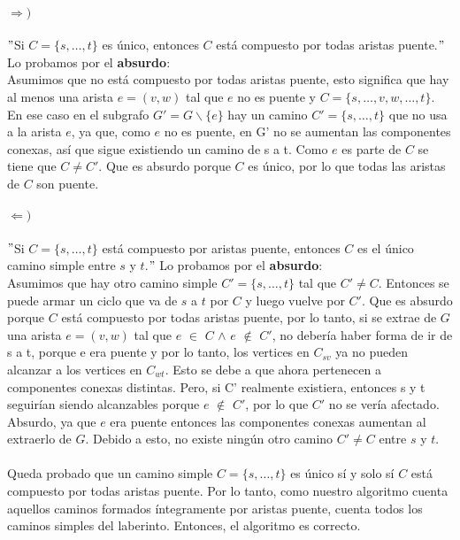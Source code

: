 \documentclass[../main.tex]{subfiles}
\begin{document}
\paragraph{\(\Rightarrow)\)} $"$Si \(C = \{s, \ldots, t\}\) es único, entonces \(C\) está compuesto por todas aristas puente.$"$ Lo probamos por el \textbf{absurdo}: \\
Asumimos que no está compuesto por todas aristas puente, esto significa que hay al menos una arista \(e = (v, w)\) tal que \(e\) no es puente y \(C = \{s, \ldots, v, w, \ldots, t\}\). \\
En ese caso en el subgrafo \(G' = G \backslash \{e\}\) hay un camino \(C' = \{s, \ldots, t\}\) que no usa a la arista \(e\), ya que, como \(e\) no es puente, en G' no se aumentan las componentes conexas, así que sigue existiendo un camino de s a t. Como \(e\) es parte de \(C\) se tiene que \(C \neq C'\). Que es absurdo porque \(C\) es único, por lo que todas las aristas de \(C\) son puente. \done
\paragraph{\(\Leftarrow)\)} $"$Si \(C = \{s, \ldots, t\}\) está compuesto por aristas puente, entonces \(C\) es el único camino simple entre \(s\)  y \(t\).$"$ Lo probamos por el \textbf{absurdo}: \\
Asumimos que hay otro camino simple \(C' = \{s, \ldots, t\}\) tal que \(C' \neq C\). Entonces se puede armar un ciclo que va de \(s\) a \(t\) por \(C\) y luego vuelve por \(C'\). Que es absurdo porque \(C\) está compuesto por todas aristas puente, por lo tanto, si se extrae de \(G\) una arista \(e = (v, w)\) tal que \(e\) $\in$ \(C\) $\land$ \(e\) $\notin$ \(C'\), no debería haber forma de ir de s a t, porque e era puente y por lo tanto, los vertices en $C_{sv}$ ya no pueden alcanzar a los vertices en $C_{wt}$. Esto se debe a que ahora pertenecen a componentes conexas distintas. Pero, si C' realmente existiera, entonces s y t seguirían siendo alcanzables porque \(e\) $\notin$ \(C'\), por lo que \(C'\) no se vería afectado. Absurdo, ya que \(e\) era puente entonces las componentes conexas aumentan al extraerlo de \(G\). Debido a esto, no existe ningún otro camino \(C' \neq C\) entre \(s\) y \(t\). \done

\paragraph{} Queda probado que un camino simple \(C = \{s, \ldots, t\}\) es único sí y solo sí \(C\) está compuesto por todas aristas puente. Por lo tanto, como nuestro algoritmo cuenta aquellos caminos formados íntegramente por aristas puente, cuenta todos los caminos simples del laberinto. Entonces, el algoritmo es correcto.
\end{document}
